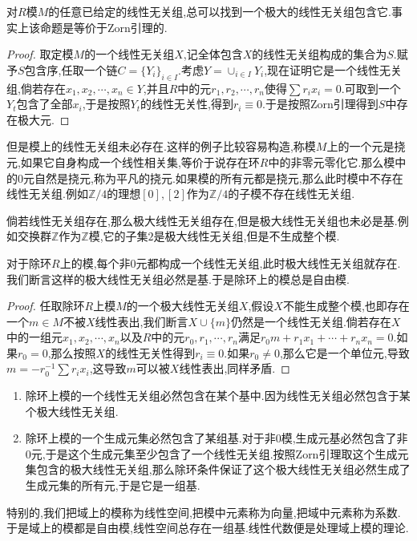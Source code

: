 对$R$模$M$的任意已给定的线性无关组,总可以找到一个极大的线性无关组包含它.事实上该命题是等价于Zorn引理的.
\begin{proof}
	
	取定模$M$的一个线性无关组$X$,记全体包含$X$的线性无关组构成的集合为$S$.赋予$S$包含序,任取一个链$C=\{Y_i\}_{i\in I}$.考虑$Y=\cup_{i\in I}Y_i$,现在证明它是一个线性无关组,倘若存在$x_1,x_2,\cdots,x_n\in Y$,并且$R$中的元$r_1,r_2,\cdots,r_n$使得$\sum r_ix_i=0$.可取到一个$Y_t$包含了全部$x_i$,于是按照$Y_t$的线性无关性,得到$r_i\equiv0$.于是按照Zorn引理得到$S$中存在极大元.
\end{proof}

但是模上的线性无关组未必存在.这样的例子比较容易构造,称模$M$上的一个元是挠元,如果它自身构成一个线性相关集,等价于说存在环$R$中的非零元零化它.那么模中的0元自然是挠元,称为平凡的挠元.如果模的所有元都是挠元,那么此时模中不存在线性无关组.例如$\mathbb{Z}/4$的理想${[0],[2]}$作为$\mathbb{Z}/4$的子模不存在线性无关组.

倘若线性无关组存在,那么极大线性无关组存在,但是极大线性无关组也未必是基.例如交换群$\mathbb{Z}$作为$\mathbb{Z}$模,它的子集${2}$是极大线性无关组,但是不生成整个模.

对于除环$R$上的模,每个非0元都构成一个线性无关组,此时极大线性无关组就存在.我们断言这样的极大线性无关组必然是基.于是除环上的模总是自由模.
\begin{proof}
	
	任取除环$R$上模$M$的一个极大线性无关组$X$,假设$X$不能生成整个模,也即存在一个$m\in M$不被$X$线性表出,我们断言$X\cup\{m\}$仍然是一个线性无关组.倘若存在$X$中的一组元$x_1,x_2,\cdots,x_n$以及$R$中的元$r_0,r_1,\cdots,r_n$满足$r_0m+r_1x_1+\cdots+r_nx_n=0$.如果$r_0=0$,那么按照$X$的线性无关性得到$r_i\equiv0$.如果$r_0\not=0$,那么它是一个单位元,导致$m=-r_0^{-1}\sum r_ix_i$,这导致$m$可以被$X$线性表出,同样矛盾.
\end{proof}
\begin{enumerate}
	\item 除环上模的一个线性无关组必然包含在某个基中.因为线性无关组必然包含于某个极大线性无关组.
	\item 除环上模的一个生成元集必然包含了某组基.对于非0模,生成元基必然包含了非0元,于是这个生成元集至少包含了一个线性无关组.按照Zorn引理取这个生成元集包含的极大线性无关组,那么除环条件保证了这个极大线性无关组必然生成了生成元集的所有元,于是它是一组基.
\end{enumerate}

特别的,我们把域上的模称为线性空间,把模中元素称为向量,把域中元素称为系数.于是域上的模都是自由模,线性空间总存在一组基.线性代数便是处理域上模的理论.

